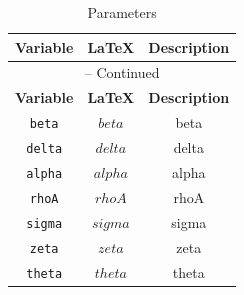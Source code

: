 \begin{center}
\begin{longtable}{ccc}
\caption{Parameters}\\%
\hline%
\multicolumn{1}{c}{\textbf{Variable}} &
\multicolumn{1}{c}{\textbf{\LaTeX}} &
\multicolumn{1}{c}{\textbf{Description}}\\%
\hline\hline%
\endfirsthead
\multicolumn{3}{c}{{\tablename} \thetable{} -- Continued}\\%
\hline%
\multicolumn{1}{c}{\textbf{Variable}} &
\multicolumn{1}{c}{\textbf{\LaTeX}} &
\multicolumn{1}{c}{\textbf{Description}}\\%
\hline\hline%
\endhead
\texttt{beta} & $beta$ & beta\\
\texttt{delta} & $delta$ & delta\\
\texttt{alpha} & $alpha$ & alpha\\
\texttt{rhoA} & $rhoA$ & rhoA\\
\texttt{sigma} & $sigma$ & sigma\\
\texttt{zeta} & $zeta$ & zeta\\
\texttt{theta} & $theta$ & theta\\
\hline%
\end{longtable}
\end{center}
